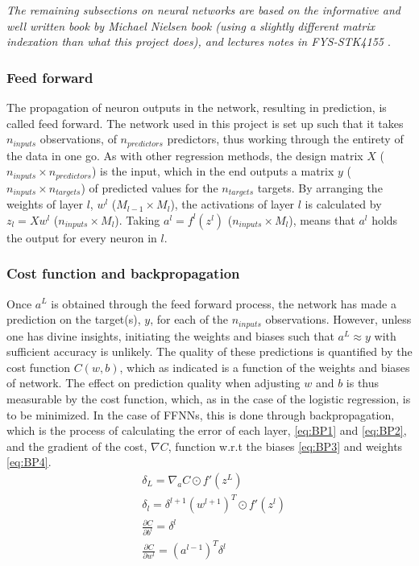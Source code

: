 \documentclass[%
oneside,                 %
final,                   %
10pt]{article}
\begin{document}
\textit{The remaining subsections on neural networks are based on the informative and well written book by Michael Nielsen book \citep{Nielsen15} (using a slightly different matrix indexation than what this project does), and lectures notes in   FYS-STK4155 \cite{MHJ_NN}}.
\subsubsection{Feed forward}
The propagation of neuron outputs in the network, resulting in prediction, is called feed forward. The network used in this project is set up such that it takes  $n_{inputs}$ observations, of $n_{predictors}$ predictors, thus working through the entirety of the data in one go. As with other regression methods, the design matrix $X$ ($n_{inputs} \times n_{predictors}$) is the input, which in the end outputs a matrix $ y$ ($n_{inputs} \times n_{targets}$) of predicted values for the $n_{targets}$ targets. By arranging the weights of layer $l$, $w^l$ ($M_{l-1} \times M_l$), the activations of layer $l$ is calculated by $z_l=X w^l$ ($n_{inputs} \times M_l$). Taking $a^l=f^l(z^l)$ ($n_{inputs} \times M_l$), means that $a^l$ holds the output for every neuron in $l$. 

\subsubsection{Cost function and backpropagation} \label{Section_M_NN}
Once $a^L$ is obtained through the feed forward process, the network has made a prediction on the target(s), $y$, for each of the $n_{inputs}$ observations. However, unless one has divine insights, initiating the weights and biases such that $a^L \approx y$ with sufficient accuracy is unlikely. The quality of these  predictions is quantified by the cost function $C(w,b)$, which as indicated is a function of the weights and biases of network. The effect on prediction quality when adjusting $w$ and $b$ is thus measurable by the cost function, which, as in the case of the logistic regression, is to be minimized. In the case of FFNNs, this is done through backpropagation, which is the process of calculating the error of each layer, \eqref{eq:BP1} and \eqref{eq:BP2}, and the gradient of the cost, $\nabla C$, function w.r.t the biases \eqref{eq:BP3} and weights \eqref{eq:BP4}. 
\begin{align}
\label{eq:BP1} &\delta_L=\nabla_a C \odot  f' (z^L) \\  
\label{eq:BP2} &\delta_l=\delta^{l+1}(w^{l+1})^T \odot  f' (z^l)\\ 
 \label{eq:BP3} &\frac{\partial C}{\partial b^l} =\delta^l\\ 
\label{eq:BP4} &\frac{\partial C}{\partial w^l} =(a^{l-1})^T \delta^l 
\end{align}
\end{document}
